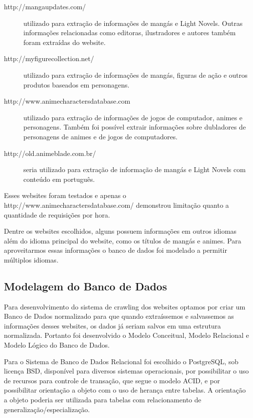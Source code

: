 \documentclass[12pt]{article}
\begin{document}
\begin{description}
\item[http://mangaupdates.com/] utilizado para extração de informações de mangás e Light Novels. Outras informações relacionadas como editoras, ilustradores e autores também foram extraídas do website.
\item[http://myfigurecollection.net/] utilizado para extração de informações de mangás, figuras de ação e outros produtos baseados em personagens.
\item[http://www.animecharactersdatabase.com] utilizado para extração de informações de jogos de computador, animes e personagens. Também foi possível extrair informações sobre dubladores de personagens de animes e de jogos de computadores. 
\item[http://old.animeblade.com.br/] seria utilizado para extração de informação de mangás e Light Novels com conteúdo em português.
\end{description}


Esses websites foram testados e apenas o http://www.animecharactersdatabase.com/ demonstrou limitação quanto a quantidade de requisições por hora.

Dentre os websites escolhidos, alguns possuem informações em outros idiomas além do idioma principal do website, como os títulos de mangás e animes. Para aproveitarmos essas informações o banco de dados foi modelado a permitir múltiplos idiomas. 


\subsection{Modelagem do Banco de Dados}

Para desenvolvimento do sistema de crawling dos websites optamos por criar um Banco de Dados normalizado para que quando extraíssemos e salvassemos as informações desses websites, os dados já seriam salvos em uma estrutura normalizada. 
Portanto foi desenvolvido o Modelo Conceitual, Modelo Relacional e Modelo Lógico do Banco de Dados. 

Para o Sistema de Banco de Dados Relacional foi escolhido o PostgreSQL, sob licença BSD, disponível para diversos sistemas operacionais, por possibilitar o uso de recursos para controle de transação, que segue o modelo ACID, e por possibilitar orientação a objeto com o uso de herança entre tabelas. A orientação a objeto poderia ser utilizada para tabelas com relacionamento de generalização/especialização. 
\end{document}
